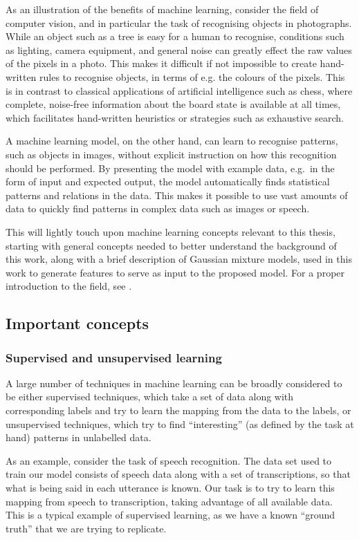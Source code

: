 As an illustration of the benefits of machine learning, consider the field of computer vision, and in particular the task of recognising objects in photographs.
While an object such as a tree is easy for a human to recognise, conditions such as lighting, camera equipment, and general noise can greatly effect the raw values of the pixels in a photo.
This makes it difficult if not impossible to create hand-written rules to recognise objects, in terms of e.g. the colours of the pixels.
This is in contrast to classical applications of artificial intelligence such as chess, where complete, noise-free information about the board state is available at all times, which facilitates hand-written heuristics or strategies such as exhaustive search.

A machine learning model, on the other hand, can learn to recognise patterns, such as objects in images, without explicit instruction on how this recognition should be performed.
By presenting the model with example data, e.g.\ in the form of input and expected output, the model automatically finds statistical patterns and relations in the data.
This makes it possible to use vast amounts of data to quickly find patterns in complex data such as images or speech.

This  will lightly touch upon machine learning concepts relevant to this thesis, starting with general concepts needed to better understand the background of this work, along with a brief description of Gaussian mixture models, used in this work to generate features to serve as input to the proposed model.
For a proper introduction to the field, see \textcite{murphy2012machine}.

\subsection{Important concepts}
\subsubsection{Supervised and unsupervised learning}

A large number of techniques in machine learning can be broadly considered to be either supervised techniques, which take a set of data along with corresponding labels and try to learn the mapping from the data to the labels, or unsupervised techniques, which try to find ``interesting'' (as defined by the task at hand) patterns in unlabelled data.

As an example, consider the task of speech recognition.
The data set used to train our model consists of speech data along with a set of transcriptions, so that what is being said in each utterance is known.
Our task is to try to learn this mapping from speech to transcription, taking advantage of all available data.
This is a typical example of supervised learning, as we have a known ``ground truth'' that we are trying to replicate.

